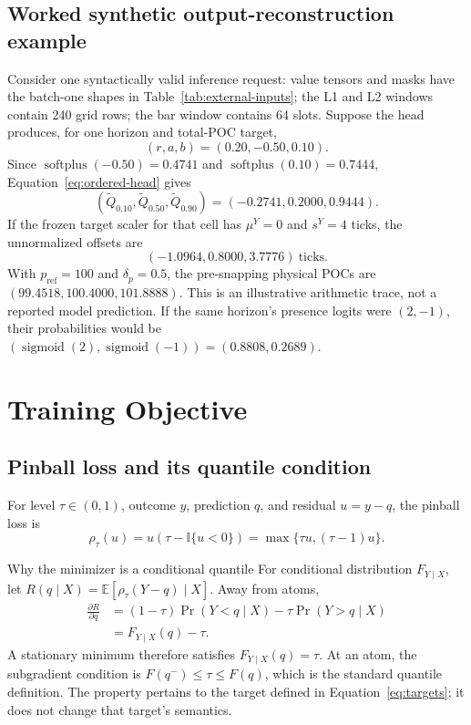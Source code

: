 \documentclass[10pt,letterpaper]{article}
\numberwithin{equation}{section}
\newcommand{\E}{\mathbb{E}}
\newcommand{\I}{\mathbb{I}}
\newcommand{\softplus}{\operatorname{softplus}}
\newcommand{\sigmoid}{\operatorname{sigmoid}}
\theoremstyle{definition}
\theoremstyle{remark}
\begin{document}
\subsection{Worked synthetic output-reconstruction example}

Consider one syntactically valid inference request: value tensors and masks
have the batch-one shapes in Table~\ref{tab:external-inputs}; the L1 and L2
windows contain 240 grid rows; the bar window contains 64 slots. Suppose the
head produces, for one horizon and total-POC target,
\begin{equation}
(r,a,b)=(0.20,-0.50,0.10).
\label{eq:worked-raw}
\end{equation}
Since $\softplus(-0.50)=0.4741$ and
$\softplus(0.10)=0.7444$, Equation~\eqref{eq:ordered-head} gives
\begin{equation}
(\widetilde Q_{0.10},\widetilde Q_{0.50},\widetilde Q_{0.90})
=(-0.2741,0.2000,0.9444).
\label{eq:worked-quantiles}
\end{equation}
If the frozen target scaler for that cell has $\mu^Y=0$ and $s^Y=4$ ticks,
the unnormalized offsets are
\begin{equation}
(-1.0964,0.8000,3.7776)\ \text{ticks}.
\label{eq:worked-ticks}
\end{equation}
With $p_{\mathrm{ref}}=100$ and $\delta_p=0.5$, the pre-snapping physical
POCs are $(99.4518,100.4000,101.8888)$. This is an illustrative arithmetic
trace, not a reported model prediction. If the same horizon's presence logits
were $(2,-1)$, their probabilities would be
$(\sigmoid(2),\sigmoid(-1))=(0.8808,0.2689)$.

\section{Training Objective}

\subsection{Pinball loss and its quantile condition}

For level $\tau\in(0,1)$, outcome $y$, prediction $q$, and residual $u=y-q$,
the pinball loss is
\begin{equation}
\rho_\tau(u)=u(\tau-\I\{u<0\})
=\max\{\tau u,(\tau-1)u\}.
\label{eq:pinball}
\end{equation}

\begin{derivationbox}{Why the minimizer is a conditional quantile}
For conditional distribution $F_{Y\mid X}$, let
$R(q\mid X)=\E[\rho_\tau(Y-q)\mid X]$. Away from atoms,
\begin{align}
\frac{\partial R}{\partial q}
&=(1-\tau)\Pr(Y<q\mid X)-\tau\Pr(Y>q\mid X)\nonumber\\
&=F_{Y\mid X}(q)-\tau.
\label{eq:pinball-derivative}
\end{align}
A stationary minimum therefore satisfies $F_{Y\mid X}(q)=\tau$. At an atom,
the subgradient condition is $F(q^-)\le\tau\le F(q)$, which is the standard
quantile definition. The property pertains to the target defined in
Equation~\eqref{eq:targets}; it does not change that target's semantics.
\end{derivationbox}
\end{document}
